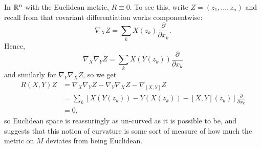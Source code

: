 \begin{example}
	In $\mathbb{R}^n$ with the Euclidean metric, $R \equiv 0$. To see this, write $Z = (z_1, \dots , z_n)$ and recall from  that covariant differentiation works componentwise:
	\begin{equation}\label{eq:componentwise covariant}
		\nabla_XZ = \sum_k X(z_k)\frac{\partial}{\partial x_k}.
	\end{equation}
	Hence,
	\[
		\nabla_X\nabla_YZ = \sum_k X(Y(z_k))\frac{\partial}{\partial x_k}
	\]
	and similarly for $\nabla_Y\nabla_XZ$, so we get
	\begin{align*}
		R(X,Y)Z & = \nabla_X\nabla_YZ - \nabla_Y\nabla_XZ - \nabla_{[X,Y]}Z \\
		& = \sum_k \left[X(Y(z_k)) - Y(X(z_k)) - [X,Y](z_k)\right]\frac{\partial}{\partial x_k} \\
		& = 0,
	\end{align*}
	so Euclidean space is reassuringly as un-curved as it is possible to be, and suggests that this notion of curvature is some sort of measure of how much the metric on $M$ deviates from being Euclidean.
\end{example}

